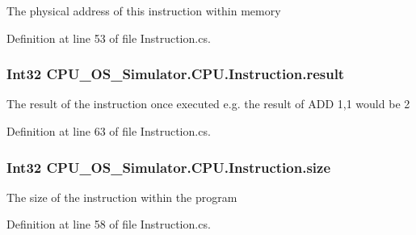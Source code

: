 The physical address of this instruction within memory 



Definition at line 53 of file Instruction.\+cs.

\hypertarget{class_c_p_u___o_s___simulator_1_1_c_p_u_1_1_instruction_a8fb993dcebcd127a335a7d068a6e9de4}{}
\subsubsection[{result}]{\setlength{\rightskip}{0pt plus 5cm}Int32 C\+P\+U\+\_\+\+O\+S\+\_\+\+Simulator.\+C\+P\+U.\+Instruction.\+result\hspace{0.3cm}{\ttfamily [private]}}\label{class_c_p_u___o_s___simulator_1_1_c_p_u_1_1_instruction_a8fb993dcebcd127a335a7d068a6e9de4}


The result of the instruction once executed e.\+g. the result of A\+D\+D 1,1 would be 2 



Definition at line 63 of file Instruction.\+cs.

\hypertarget{class_c_p_u___o_s___simulator_1_1_c_p_u_1_1_instruction_ac8c820f3e522e4fefaa510856ed11fb0}{}
\subsubsection[{size}]{\setlength{\rightskip}{0pt plus 5cm}Int32 C\+P\+U\+\_\+\+O\+S\+\_\+\+Simulator.\+C\+P\+U.\+Instruction.\+size\hspace{0.3cm}{\ttfamily [private]}}\label{class_c_p_u___o_s___simulator_1_1_c_p_u_1_1_instruction_ac8c820f3e522e4fefaa510856ed11fb0}


The size of the instruction within the program 



Definition at line 58 of file Instruction.\+cs.

\hypertarget{class_c_p_u___o_s___simulator_1_1_c_p_u_1_1_instruction_a0337c93fbfb5993eab37f1d052ca5f43}{}
